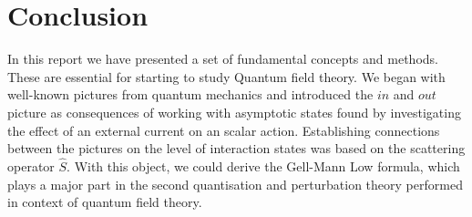 \documentclass[
11pt, %
english, %
singlespacing, %
headsepline, %
]{MastersDoctoralThesis} %
\begin{document}
\chapter{Conclusion}
In this report we have presented a set of fundamental concepts and methods. These are essential for starting to study Quantum field theory. We began with well-known pictures from quantum mechanics and introduced the $ in $ and $ out $ picture as consequences of working with asymptotic states found by investigating the effect of an external current on an scalar action. Establishing connections between the pictures on the level of interaction states was based on the scattering operator $ \hat{S} $. With this object, we could derive the Gell-Mann Low formula, which plays a major part in the second quantisation and perturbation theory performed in context of quantum field theory. 
\newpage
\end{document}
